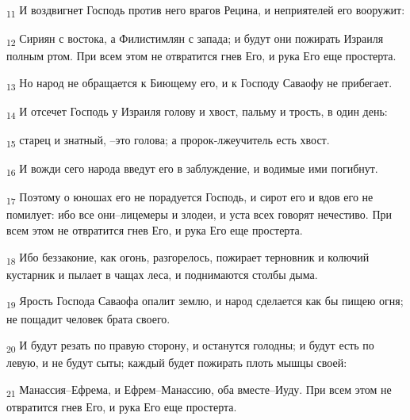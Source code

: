\begin{tcolorbox}
\textsubscript{11} И воздвигнет Господь против него врагов Рецина, и неприятелей его вооружит:
\end{tcolorbox}
\begin{tcolorbox}
\textsubscript{12} Сириян с востока, а Филистимлян с запада; и будут они пожирать Израиля полным ртом. При всем этом не отвратится гнев Его, и рука Его еще простерта.
\end{tcolorbox}
\begin{tcolorbox}
\textsubscript{13} Но народ не обращается к Биющему его, и к Господу Саваофу не прибегает.
\end{tcolorbox}
\begin{tcolorbox}
\textsubscript{14} И отсечет Господь у Израиля голову и хвост, пальму и трость, в один день:
\end{tcolorbox}
\begin{tcolorbox}
\textsubscript{15} старец и знатный, --это голова; а пророк-лжеучитель есть хвост.
\end{tcolorbox}
\begin{tcolorbox}
\textsubscript{16} И вожди сего народа введут его в заблуждение, и водимые ими погибнут.
\end{tcolorbox}
\begin{tcolorbox}
\textsubscript{17} Поэтому о юношах его не порадуется Господь, и сирот его и вдов его не помилует: ибо все они--лицемеры и злодеи, и уста всех говорят нечестиво. При всем этом не отвратится гнев Его, и рука Его еще простерта.
\end{tcolorbox}
\begin{tcolorbox}
\textsubscript{18} Ибо беззаконие, как огонь, разгорелось, пожирает терновник и колючий кустарник и пылает в чащах леса, и поднимаются столбы дыма.
\end{tcolorbox}
\begin{tcolorbox}
\textsubscript{19} Ярость Господа Саваофа опалит землю, и народ сделается как бы пищею огня; не пощадит человек брата своего.
\end{tcolorbox}
\begin{tcolorbox}
\textsubscript{20} И будут резать по правую сторону, и останутся голодны; и будут есть по левую, и не будут сыты; каждый будет пожирать плоть мышцы своей:
\end{tcolorbox}
\begin{tcolorbox}
\textsubscript{21} Манассия--Ефрема, и Ефрем--Манассию, оба вместе--Иуду. При всем этом не отвратится гнев Его, и рука Его еще простерта.
\end{tcolorbox}
